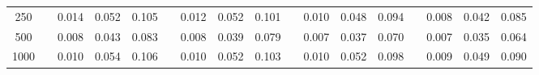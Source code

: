 % 
\begin{tabular}{ccccccccccccccccc}
  \hline
  \hline
250 &  & 0.014 & 0.052 & 0.105 &  & 0.012 & 0.052 & 0.101 &  & 0.010 & 0.048 & 0.094 &  & 0.008 & 0.042 & 0.085 \\ 
  500 &  & 0.008 & 0.043 & 0.083 &  & 0.008 & 0.039 & 0.079 &  & 0.007 & 0.037 & 0.070 &  & 0.007 & 0.035 & 0.064 \\ 
  1000 &  & 0.010 & 0.054 & 0.106 &  & 0.010 & 0.052 & 0.103 &  & 0.010 & 0.052 & 0.098 &  & 0.009 & 0.049 & 0.090 \\ 
   \hline
\end{tabular}
